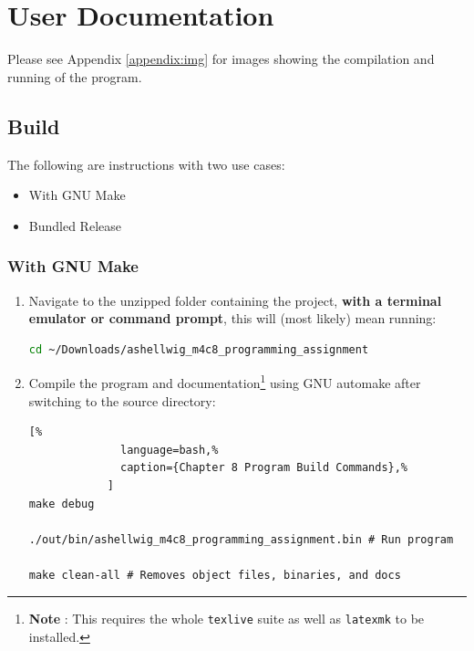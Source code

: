 \documentclass[a4paper, 11pt]{article}
\theoremstyle{definition}
\theoremstyle{plain}
\begin{document}
  \newpage
  \section{User Documentation}
    Please see Appendix \ref{appendix:img} for images showing the compilation
      and running of the program.

    \subsection{Build}
      The following are instructions with two use cases:
      \begin{itemize}
        \item With GNU Make
        \item Bundled Release
      \end{itemize}
      \subsubsection{With GNU Make}
        \begin{enumerate}
          \item Navigate to the unzipped folder containing the project,
            \textbf{with a terminal emulator or command prompt}, this will
            (most likely) mean running:
            \begin{lstlisting}[language=bash]
cd ~/Downloads/ashellwig_m4c8_programming_assignment
            \end{lstlisting}
          \item Compile the program and documentation\footnote{\textbf{Note%
            }: This requires the whole \texttt{texlive} suite as well as
            \texttt{latexmk} to be installed.} using GNU automake after
            switching to the source directory:
            \begin{lstlisting}[%
              language=bash,%
              caption={Chapter 8 Program Build Commands},%
            ]
make debug

./out/bin/ashellwig_m4c8_programming_assignment.bin # Run program

make clean-all # Removes object files, binaries, and docs
            \end{lstlisting}
          \end{enumerate}
\end{document}
